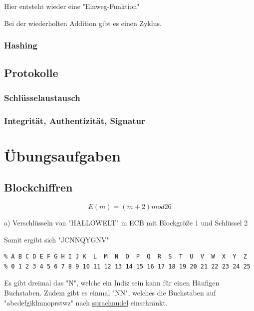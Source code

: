 \documentclass[a4paper]{article}
\begin{document}
Hier entsteht wieder eine "Einweg-Funktion"

Bei der wiederholten Addition gibt es einen Zyklus.


\subsubsection{Hashing}



\subsection{Protokolle}

\subsubsection{Schlüsselaustausch}

\subsubsection{Integrität, Authentizität, Signatur}

\section{Übungsaufgaben}


\subsection{Blockchiffren}

$$E(m) = (m+2) mod 26$$

a) Verschlüsseln von "HALLOWELT" in ECB mit Blockgröße 1 und Schlüssel 2

Somit ergibt sich "JCNNQYGNV"

\begin{lstlisting}
% A B C D E F G H I J K  L  M  N  O  P  Q  R  S  T  U  V  W  X  Y  Z
% 0 1 2 3 4 5 6 7 8 9 10 11 12 13 14 15 16 17 18 19 20 21 22 23 24 25
\end{lstlisting}

Es gibt dreimal das "N", welche ein Indiz sein kann für einen Häufigen Buchstaben. Zudem gibt es einmal "NN", welches die Buchstaben auf "abcdefgiklmnoprstwz" nach \href{https://www.sprachnudel.de/woerterbuch/wortsuche/woerter-mit-doppelbuchstaben}{sprachnudel} einschränkt.
\end{document}
